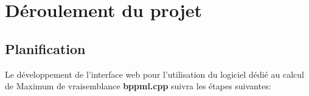 
%

\section{Déroulement du projet} 

\subsection{Planification}

Le développement de l'interface web pour l'utilisation du 
logiciel dédié au calcul de Maximum de vraisemblance \textbf{bppml.cpp} suivra les
 étapes suivantes:

